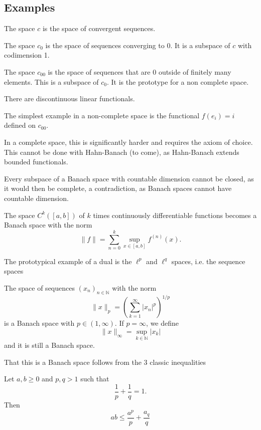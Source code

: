 \documentclass[twoside,symmetric, openany, 12pt]{./tuftebook}
\theoremstyle{definition}
\theoremstyle{definition}
\theoremstyle{definition}
\newcommand{\N}{\mathbb{N}}
\begin{document}
\subsection{Examples}
\begin{Example}
	The space $c$ is the space of convergent sequences.
\end{Example}
\begin{Example}
	The space $c_0$ is the space of sequences converging to 0. It is a subspace of $c$ with codimension 1.
\end{Example}
\begin{Example}
	The space $c_{00}$ is the space of sequences that are 0 outside of finitely many elements. This is a subspace of $c_0$. It is the prototype for a non complete space. 
\end{Example}
\begin{Example}
	There are discontinuous linear functionals.
	
	The simplest example in a non-complete space is the functional $f(e_i)=i$ defined on $c_{00}$. 
	
	In a complete space, this is significantly harder and requires the axiom of choice. This cannot be done with Hahn-Banach (to come), as Hahn-Banach extends bounded functionals. 
\end{Example}
\begin{Example}
	Every subspace of a Banach space with countable dimension cannot be closed, as it would then be complete, a contradiction, as Banach spaces cannot have countable dimension. 
\end{Example}
\begin{Example}
	The space $C^k([a,b])$ of $k$ times continuously differentiable functions becomes a Banach space with the norm
	\[\|f\| = \sum_{n=0}^k \sup_{x\in [a,b]} f^{(n)}(x).\]
\end{Example}
The prototypical example of a dual is the $\ell^p$ and $\ell^q$ spaces, i.e. the sequence spaces
\begin{Definition}[$\ell^p$]
	The space of sequences $(x_n)_{n\in \N}$ with the norm
	\[\|x\|_p = \left(\sum_{k=1}^\infty |x_n|^p\right)^{1/p}\]
	is a Banach space with $p\in (1,\infty)$. If $p=\infty$, we define
	\[\|x\|_\infty = \sup_{k\in \N} |x_k|\]
	and it is still a Banach space.
\end{Definition}
That this is a Banach space follows from the 3 classic inequalities
\begin{Theorem}
	Let $a,b\ge 0$ and $p,q>1$ such that
	\[\frac 1p + \frac 1q = 1.\]
	Then
	\[ab \le \frac{a^p}{p}+ \frac{a_q}{q}\]
\end{Theorem}
\end{document}
